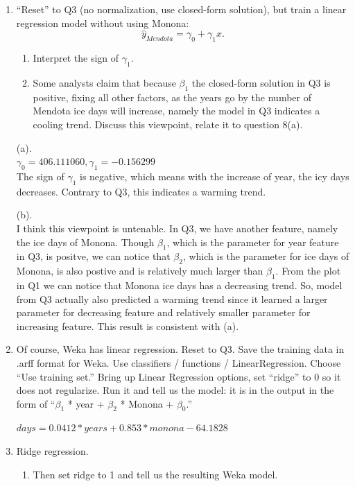 \documentclass[a4paper]{article}
\theoremstyle{definition}
\newenvironment{soln}{
    \leavevmode\color{blue}\ignorespaces
}{}
\begin{document}
\begin{enumerate}
\item 
``Reset'' to Q3 (no normalization,  use closed-form solution), but train a linear regression model without using Monona:
$$\hat y_{Mendota} = \gamma_0 + \gamma_1 x.$$
  \begin{enumerate}
  \item Interpret the sign of $\gamma_1$.
  \item Some analysts claim that because $\beta_1$ the closed-form solution in Q3 is positive, fixing all other factors, as the years go by the number of Mendota ice days will increase, namely the model in Q3 indicates a cooling trend. Discuss this viewpoint, relate it to question 8(a).
  \end{enumerate}

\begin{soln}
(a).\\
 $\gamma_0 = 406.111060, \gamma_1 =  -0.156299$\\
 The sign of $\gamma_1$ is negative, which means with the increase of year, the icy days decreases. Contrary to Q3, this indicates a warming trend.

(b).\\
I think this viewpoint is untenable. In Q3, we have another feature, namely the ice days of Monona. Though $\beta_1$, which is the parameter for year feature in Q3, is positve, we can notice that $\beta_2$, which is the parameter for ice days of Monona, is also postive and is relatively much larger than $\beta_1$. From the plot in Q1 we can notice that Monona ice days has a decreasing trend. So, model from Q3 actually also predicted a warming trend since it learned a larger parameter for decreasing feature and relatively smaller parameter for increasing feature. This result is consistent with (a).
\end{soln}

\item
Of course, Weka has linear regression.  Reset to Q3.  Save the training data in .arff format for Weka.  Use classifiers / functions / LinearRegression.  Choose ``Use training set.''  
  Bring up Linear Regression options, set ``ridge'' to 0 so it does not regularize.  Run it and tell us the model: it is in the output in the form of ``$\beta_1$ * year + $\beta_2$ * Monona + $\beta_0$.'' 

\begin{soln}
$days = 0.0412 * years + 0.853  * monona -64.1828$
\end{soln}

\item Ridge regression.
\begin{enumerate}
\item
Then set ridge to 1 and tell us the resulting Weka model.


\end{enumerate}
\end{enumerate}
\end{document}
